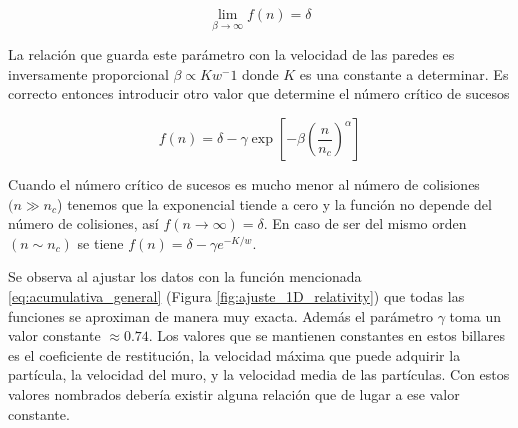 \documentclass[11pt, spanish]{book}
\newcommand{\cambios}[1]{\textcolor{green!70!black}{#1}}
\begin{document}
\begin{equation}
    \lim_{\beta \rightarrow \infty} f(n) = \delta
\end{equation}

\cambios{La relación que guarda este parámetro con la velocidad de las paredes es inversamente proporcional \( \beta \propto Kw^-1 \) donde \( K \) es una constante a determinar. Es correcto entonces introducir otro valor que determine el número crítico de sucesos}

\begin{equation}
    f(n) = \delta - \gamma \exp\left[ -\beta \left( \dfrac{n}{n_c} \right)^\alpha \right]
\end{equation}

\cambios{Cuando el número crítico de sucesos es mucho menor al número de colisiones \((n\gg n_c \)) tenemos que la exponencial tiende a cero y la función no depende del número de colisiones, así \( f(n \rightarrow \infty) = \delta \). En caso de ser del mismo orden \( (n \sim n_c) \) se tiene \( f(n) = \delta - \gamma e^{-K/w} \). } 

\vspace{3mm}

Se observa al ajustar los datos con la función mencionada \ref{eq:acumulativa_general} (Figura \ref{fig:ajuste_1D_relativity}) que todas las funciones se aproximan de manera muy exacta. Además el parámetro \( \gamma \) toma un valor constante \( \approx 0.74 \). Los valores que se mantienen constantes en estos billares es el coeficiente de restitución, la velocidad máxima que puede adquirir la partícula, la velocidad del muro, y la velocidad media de las partículas. Con estos valores nombrados debería existir alguna relación que de lugar a ese valor constante. 
\end{document}
